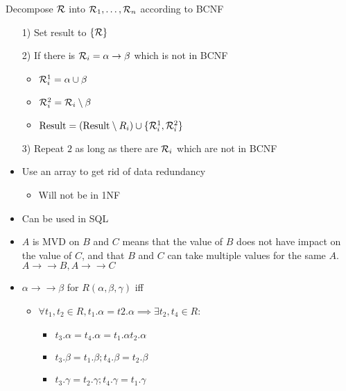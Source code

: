 \begin{itemize}
\begin{itemize}
\begin{itemize}
                \end{itemize}
             Decompose $\mathcal{R}$ into $\mathcal{R}_1, \dots, \mathcal{R}_n$ according to BCNF
                \begin{itemize}
                    \item[1)] Set result to $\{\mathcal{R}\}$
                    \item[2)] If there is $\mathcal{R}_i = \alpha \to \beta$ which is not in BCNF
                        \begin{itemize}
                            \item $\mathcal{R}^1_i = \alpha \cup \beta$
                            \item $\mathcal{R}^2_i = \mathcal{R}_i \setminus \beta$
                            \item $\text{Result} = (\text{Result} \setminus R_i) \cup \{\mathcal{R}^1_i, \mathcal{R}^2_i\}$
                        \end{itemize}
                    \item[3)] Repeat $2$ as long as there are $\mathcal{R}_i$ which are not in BCNF
                \end{itemize} 
        \end{itemize}
        \begin{itemize}
            \item Use an array to get rid of data redundancy
                \begin{itemize}
                    \item Will not be in 1NF
                \end{itemize}
            \item Can be used in SQL
        \end{itemize}
        \begin{itemize}
                \begin{itemize}
                    \item $A$ is MVD on $B$ and $C$ means that the value of $B$ does not have impact on the value of $C$, and that $B$ and $C$ can take multiple values for the same $A$.
                     $A \to \to B, A \to \to C$
                    \item $\alpha \to \to \beta$ for $R(\alpha, \beta, \gamma)$ iff
                        \begin{itemize}
                            \item $\forall t_1, t_2 \in R, t_1.\alpha = t2.\alpha \implies \exists t_2,t_4 \in R$:
                                \begin{itemize}
                                    \item $t_3.\alpha = t_4.\alpha = t_1.\alpha t_2.\alpha$
                                    \item $t_3.\beta = t_1.\beta; t_4.\beta = t_2.\beta$
                                    \item $t_3.\gamma = t_2.\gamma; t_4.\gamma = t_1.\gamma$


\end{itemize}
\end{itemize}
\end{itemize}
\end{itemize}
\end{itemize}
